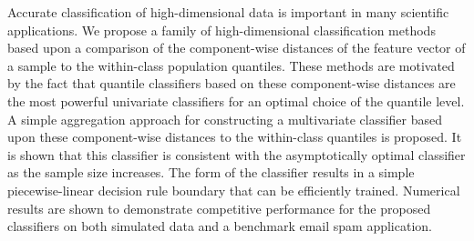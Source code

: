 
Accurate classification of high-dimensional data is important in many scientific
applications.  We propose a family of high-dimensional classification methods
based upon a comparison of the component-wise distances of the feature vector of
a sample to the within-class population quantiles.  These methods are motivated
by the fact that quantile classifiers based on these component-wise distances
are the most powerful univariate classifiers for an optimal choice of the
quantile level.  A simple aggregation approach for constructing a multivariate
classifier based upon these component-wise distances to the within-class
quantiles is proposed.  It is shown that this classifier is consistent with the
asymptotically optimal classifier as the sample size increases.  The form of the
classifier results in a simple piecewise-linear decision rule boundary that can
be efficiently trained.  Numerical results are shown to demonstrate competitive
performance for the proposed classifiers on both simulated data and a benchmark
email spam application.




